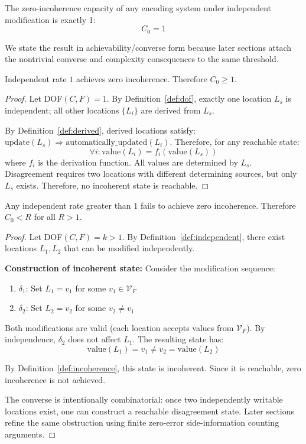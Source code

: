 \begin{theorem}\label{thm:coherence-capacity}
The zero-incoherence capacity of any encoding system under independent modification is exactly 1:
\[
C_0 = 1
\]
\end{theorem}

We state the result in achievability/converse form because later sections attach the nontrivial converse and complexity consequences to the same threshold.

\begin{theorem}[Achievability]\label{thm:capacity-achievability}
Independent rate $1$ achieves zero incoherence. Therefore $C_0 \geq 1$.
\end{theorem}

\begin{proof}
Let DOF$(C, F) = 1$. By Definition~\ref{def:dof}, exactly one location $L_s$ is independent; all other locations $\{L_i\}$ are derived from $L_s$.

By Definition~\ref{def:derived}, derived locations satisfy: $\text{update}(L_s) \Rightarrow \text{automatically\_updated}(L_i)$. Therefore, for any reachable state:
\[
\forall i: \text{value}(L_i) = f_i(\text{value}(L_s))
\]
where $f_i$ is the derivation function. All values are determined by $L_s$. Disagreement requires two locations with different determining sources, but only $L_s$ exists. Therefore, no incoherent state is reachable.
\end{proof}

\begin{theorem}[Converse]\label{thm:capacity-converse}
Any independent rate greater than $1$ fails to achieve zero incoherence. Therefore $C_0 < R$ for all $R > 1$.
\end{theorem}

\begin{proof}
Let DOF$(C, F) = k > 1$. By Definition~\ref{def:independent}, there exist locations $L_1, L_2$ that can be modified independently.

\textbf{Construction of incoherent state:} Consider the modification sequence:
\begin{enumerate}
\tightlist
\item $\delta_1$: Set $L_1 = v_1$ for some $v_1 \in \mathcal{V}_F$
\item $\delta_2$: Set $L_2 = v_2$ for some $v_2 \neq v_1$
\end{enumerate}

Both modifications are valid (each location accepts values from $\mathcal{V}_F$). By independence, $\delta_2$ does not affect $L_1$. The resulting state has:
\[
\text{value}(L_1) = v_1 \neq v_2 = \text{value}(L_2)
\]

By Definition~\ref{def:incoherence}, this state is incoherent. Since it is reachable, zero incoherence is not achieved.

The converse is intentionally combinatorial: once two independently writable locations exist, one can construct a reachable disagreement state. Later sections refine the same obstruction using finite zero-error side-information counting arguments.
\end{proof}


